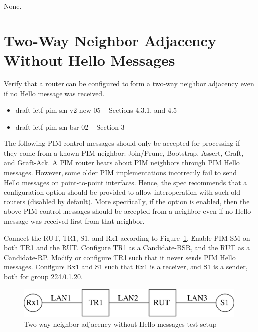 \documentclass[11pt]{report}
\begin{document}
None.

\newpage
\section{Two-Way Neighbor Adjacency Without Hello Messages}

Verify that a router can be configured to form a two-way neighbor adjacency
even if no Hello message was received.

\begin{itemize}
  \item draft-ietf-pim-sm-v2-new-05 -- Sections 4.3.1, and 4.5
  \item draft-ietf-pim-sm-bsr-02 -- Section 3
\end{itemize}

The following PIM control messages should only be accepted for processing if
they come from a known PIM neighbor: Join/Prune, Bootstrap, Assert, Graft, and
Graft-Ack. A PIM router hears about PIM neighbors
through PIM Hello messages. However, some older PIM implementations
incorrectly fail to send Hello messages on point-to-point interfaces. Hence,
the spec recommends that a configuration option should be provided to allow
interoperation with such old routers (disabled by default). More specifically,
if the option is enabled, then the above PIM control messages should be
accepted from a neighbor even if no Hello message was received first from that
neighbor.

Connect the RUT, TR1, S1, and Rx1 according to
Figure~\ref{fig:two_way_neighbor_adjacency_without_hello_messages}.
Enable PIM-SM on both TR1 and the RUT. Configure TR1
as a Candidate-BSR, and the RUT as a Candidate-RP. Modify or configure TR1
such that it never sends PIM Hello messages. Configure Rx1 and S1 such
that Rx1 is a receiver, and S1 is a sender, both for group 224.0.1.20.

\begin{figure}[htbp]
  \begin{center}
    \includegraphics[scale=0.8]{figs/pim_test_2_7_two_way_neighbor_adjacency_without_hello_messages}
    \caption{Two-way neighbor adjacency without Hello messages test
    setup}
    \label{fig:two_way_neighbor_adjacency_without_hello_messages}
  \end{center}
\end{figure}
\end{document}
